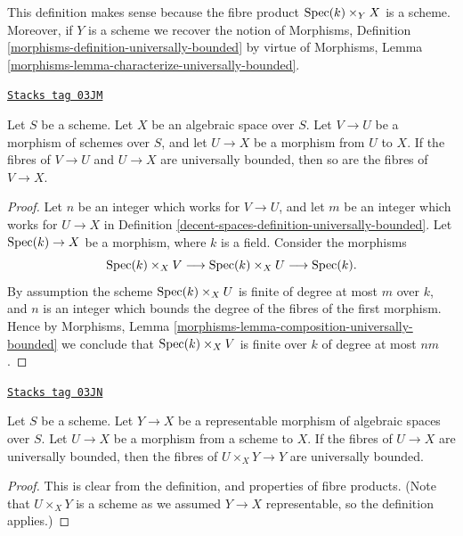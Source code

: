 This definition makes sense because the fibre product
$\operatorname{Spec}(k) \times_Y X$ is a scheme. Moreover, if $Y$ is a scheme
we recover the notion of
Morphisms, Definition \ref{morphisms-definition-universally-bounded}
by virtue of
Morphisms, Lemma \ref{morphisms-lemma-characterize-universally-bounded}.

\begin{lemma}
\label{decent-spaces-lemma-composition-universally-bounded}
\href{https://stacks.math.columbia.edu/tag/03JM}{\texttt{Stacks tag 03JM}}

Let $S$ be a scheme. Let $X$ be an algebraic space over $S$.
Let $V \to U$ be a morphism of schemes over $S$, and let
$U \to X$ be a morphism from $U$ to $X$. If the fibres of
$V \to U$ and $U \to X$ are universally bounded, then so
are the fibres of $V \to X$.
\end{lemma}

\begin{proof}
Let $n$ be an integer which works for $V \to U$, and let $m$ be
an integer which works for $U \to X$ in
Definition \ref{decent-spaces-definition-universally-bounded}.
Let $\operatorname{Spec}(k) \to X$ be a morphism, where $k$ is a field.
Consider the morphisms
$$
\operatorname{Spec}(k) \times_X V
\longrightarrow
\operatorname{Spec}(k) \times_X U
\longrightarrow
\operatorname{Spec}(k).
$$
By assumption the scheme $\operatorname{Spec}(k) \times_X U$
is finite of degree at most $m$ over $k$, and $n$ is an integer which
bounds the degree of the fibres of the first morphism. Hence by
Morphisms, Lemma \ref{morphisms-lemma-composition-universally-bounded}
we conclude that $\operatorname{Spec}(k) \times_X V$ is finite over $k$
of degree at most $nm$.
\end{proof}

\begin{lemma}
\label{decent-spaces-lemma-base-change-universally-bounded}
\href{https://stacks.math.columbia.edu/tag/03JN}{\texttt{Stacks tag 03JN}}

Let $S$ be a scheme.
Let $Y \to X$ be a representable morphism of algebraic spaces over $S$.
Let $U \to X$ be a morphism from a scheme to $X$.
If the fibres of $U \to X$ are universally bounded, then the fibres
of $U \times_X Y \to Y$ are universally bounded.
\end{lemma}

\begin{proof}
This is clear from the definition, and properties of fibre products.
(Note that $U \times_X Y$ is a scheme
as we assumed $Y \to X$ representable, so the definition applies.)
\end{proof}

